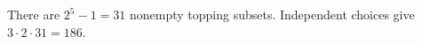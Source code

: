 There are $2^5-1=31$ nonempty topping subsets. Independent choices give $3\cdot2\cdot31=\boxed{186}$.
